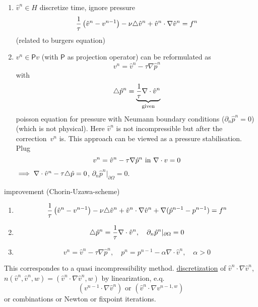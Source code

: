 \begin{enumerate}[label = \roman*)]
	\item $\hat{v}^n \in H$ discretize time, ignore pressure
	\begin{equation*}
		\frac{1}{\tau} \left( \hat{v}^n - v^{n-1} \right)- \nu \triangle \hat{v}^n + \hat{v}^n \cdot \nabla \hat{v}^n = f^n
	\end{equation*}(related to burgers equation)
	\item $v^n \in \mathsf{P}v$ (with $\mathsf{P}$ as projection operator) can be reformulated as 
	\begin{equation*}
		v^n = \hat{v}^n - \tau \nabla \hat{p}^n
	\end{equation*}
	with 
	\begin{equation*}
		\triangle \hat{p}^n = \underbrace{\frac{1}{\tau} \nabla \cdot \hat{v}^n }_{\text{given}}
	\end{equation*}
	poisson equation for pressure with Neumann boundary conditions ($\partial_n \hat{p}^n =0$)\\(which is not physical).
	Here $\hat{v}^n$ is not incompressible but after the \glqq correction\grqq \ $v^n$ is. This approach can be viewed as a pressure stabilisation. Plug 
	\begin{equation*}
		v^n = \hat{v}^n - \tau \nabla \hat{p}^n \text{ in } \nabla \cdot v =0
	\end{equation*}
	$\implies \nabla \cdot \hat{v}^n - \tau \triangle \hat{p} = 0$, $\partial_n \hat{p}^n|_{\partial\Omega}=0$. 
\end{enumerate}
improvement (Chorin-Uzawa-scheme)
\begin{enumerate}[label = \roman*)]
	\item 
	\begin{equation*}
		\frac{1}{\tau} \left( \hat{v}^n - v^{n-1} \right)- \nu \triangle \hat{v}^n + \hat{v}^n \cdot \nabla \hat{v}^n + \nabla ( \hat{p}^{n-1} - p^{n-1})= f^n
	\end{equation*}
	\item 
	\begin{equation*}
		\triangle \hat{p}^n = \frac{1}{\tau} \nabla \cdot \hat{v}^n ,\quad \partial_n \hat{p}^n|_{\partial \Omega} =0
	\end{equation*}
	\item 
	\begin{equation*}
		v^n = \hat{v}^n - \tau \nabla \hat{p}^n, \quad p^n =p^{n-1} - \alpha \nabla \cdot \hat{v}^n ,\quad \alpha >0
	\end{equation*}
\end{enumerate}
This correspondes to a quasi incompressibility method.\nl
\underline{discretization} of $\hat{v}^n \cdot \nabla \hat{v}^n$, $n(\hat{v}^n,\hat{v}^n,w) = (\hat{v}^n\cdot \nabla \hat{v}^n ,w)$ by linearization, e.q.
\begin{equation*}
	(v^{n-1}\cdot \nabla \hat{v}^n) \text{ or } (\hat{v}^n \cdot \nabla v^{n-1,w}) 
\end{equation*}
or combinations or Newton or fixpoint iterations.

